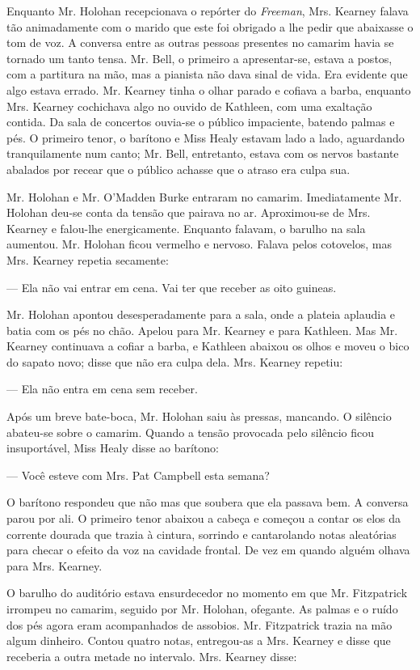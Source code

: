 Enquanto Mr. Holohan recepcionava o repórter do \textit{Freeman}, Mrs. Kearney
falava tão animadamente com o marido que este foi obrigado a lhe pedir
que abaixasse o tom de voz. A conversa entre as outras pessoas
presentes no camarim havia se tornado um tanto tensa. Mr. Bell, o
primeiro a apresentar-se, estava a postos, com a partitura na mão, mas
a pianista não dava sinal de vida. Era evidente que algo estava
errado. Mr. Kearney tinha o olhar parado e cofiava a barba, enquanto
Mrs. Kearney cochichava algo no ouvido de Kathleen, com uma exaltação
contida. Da sala de concertos ouvia-se o público impaciente, batendo
palmas e pés. O primeiro tenor, o barítono e Miss Healy estavam lado
a lado, aguardando tranquilamente num canto; Mr. Bell, entretanto,
estava com os nervos bastante abalados por recear que o público
achasse que o atraso era culpa sua.

Mr. Holohan e Mr. O'Madden Burke entraram no camarim. Imediatamente
Mr. Holohan deu-se conta da tensão que pairava no ar. Aproximou-se de
Mrs. Kearney e falou-lhe energicamente. Enquanto falavam, o barulho na
sala aumentou. Mr. Holohan ficou vermelho e nervoso. Falava pelos
cotovelos, mas Mrs. Kearney repetia secamente:

--- Ela não vai entrar em cena. Vai ter que receber as oito guineas.

Mr. Holohan apontou desesperadamente para a sala, onde a plateia
aplaudia e batia com os pés no chão. Apelou para Mr. Kearney e para
Kathleen. Mas Mr. Kearney continuava a cofiar a barba, e Kathleen
abaixou os olhos e moveu o bico do sapato novo; disse que não era
culpa dela. Mrs. Kearney repetiu:

--- Ela não entra em cena sem receber.

Após um breve bate-boca, Mr. Holohan saiu às pressas, mancando. O
silêncio abateu-se sobre o camarim. Quando a tensão provocada pelo
silêncio ficou insuportável, Miss Healy disse ao barítono:

--- Você esteve com Mrs. Pat Campbell esta semana?

O barítono respondeu que não mas que soubera que ela passava bem.
A conversa parou por ali. O primeiro tenor abaixou a cabeça e começou
a contar os elos da corrente dourada que trazia à cintura, sorrindo e
cantarolando notas aleatórias para checar o efeito da voz na cavidade
frontal. De vez em quando alguém olhava para Mrs. Kearney.

O barulho do auditório estava ensurdecedor no momento em que Mr.
Fitzpatrick irrompeu no camarim, seguido por Mr. Holohan, ofegante. As
palmas e o ruído dos pés agora eram acompanhados de assobios. Mr.
Fitzpatrick trazia na mão algum dinheiro. Contou quatro notas,
entregou-as a Mrs. Kearney e disse que receberia a outra metade no
intervalo. Mrs. Kearney disse:

